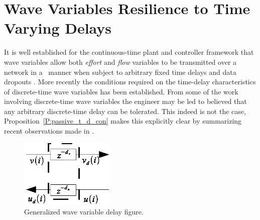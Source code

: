 \section{Wave Variables Resilience to Time Varying Delays}
\label{S:wave_vars_time_delay}
It is well established for the continuous-time plant and controller framework that wave variables allow both {\it effort} and {\it flow} variables to be transmitted over a network in a \passive\ manner when subject to arbitrary fixed time delays and data dropouts \cite{anderson92:_asymp_stabil_for_force_reflec, niemeyer04:_telem}.
More recently the conditions required on the time-delay characteristics of discrete-time wave variables has been established.  From some of the work involving discrete-time wave variables the engineer may be led to believed that any arbitrary discrete-time delay can be tolerated.  This indeed is not the case, Proposition~\ref{P:passive_t_d_con} makes this explicitly clear by summarizing recent observations  made in \cite{cst08, stramigioli05:_sampl_hamil, kottenstette07:_stabl_digit_contr_networ_contin, kottenstette08:_wirel_digit_contr_of_contin}.
\begin{figure}
  \centering
  \includegraphics[width=1.8in]{figures/prop_delays}
  \caption{Generalized wave variable delay figure.}
  \label{fig:prop_delays}
\end{figure}

